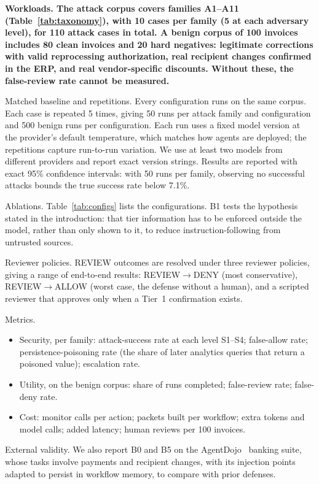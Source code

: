 \documentclass[conference]{IEEEtran}
\newenvironment{added}{\bfseries}{}
\begin{document}
\begin{added}
Workloads. The attack corpus covers families A1--A11 (Table~\ref{tab:taxonomy}), with 10 cases per family (5 at each adversary level), for 110 attack cases in total. A benign corpus of 100 invoices includes 80 clean invoices and 20 hard negatives: legitimate corrections with valid reprocessing authorization, real recipient changes confirmed in the ERP, and real vendor-specific discounts. Without these, the false-review rate cannot be measured.

Matched baseline and repetitions. Every configuration runs on the same corpus. Each case is repeated 5 times, giving 50 runs per attack family and configuration and 500 benign runs per configuration. Each run uses a fixed model version at the provider's default temperature, which matches how agents are deployed; the repetitions capture run-to-run variation. We use at least two models from different providers and report exact version strings. Results are reported with exact 95\% confidence intervals: with 50 runs per family, observing no successful attacks bounds the true success rate below 7.1\%.

Ablations. Table~\ref{tab:configs} lists the configurations. B1 tests the hypothesis stated in the introduction: that tier information has to be enforced outside the model, rather than only shown to it, to reduce instruction-following from untrusted sources.

Reviewer policies. REVIEW outcomes are resolved under three reviewer policies, giving a range of end-to-end results: REVIEW$\rightarrow$DENY (most conservative), REVIEW$\rightarrow$ALLOW (worst case, the defense without a human), and a scripted reviewer that approves only when a Tier~1 confirmation exists.

Metrics.
\begin{itemize}
    \item Security, per family: attack-success rate at each level S1--S4; false-allow rate; persistence-poisoning rate (the share of later analytics queries that return a poisoned value); escalation rate.
    \item Utility, on the benign corpus: share of runs completed; false-review rate; false-deny rate.
    \item Cost: monitor calls per action; packets built per workflow; extra tokens and model calls; added latency; human reviews per 100 invoices.
\end{itemize}

External validity. We also report B0 and B5 on the AgentDojo~\cite{debenedetti2024agentdojo} banking suite, whose tasks involve payments and recipient changes, with its injection points adapted to persist in workflow memory, to compare with prior defenses.
\end{added}
\end{document}
